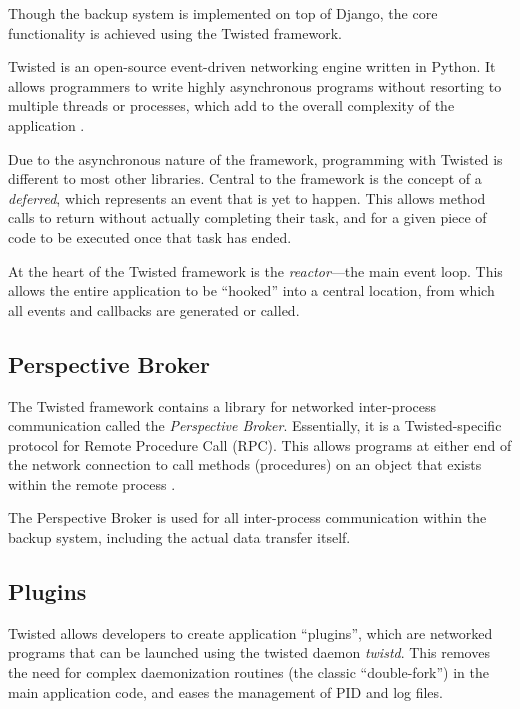 Though the backup system is implemented on top of Django, the core
functionality is achieved using the Twisted framework.

Twisted is an open-source event-driven networking engine written in Python. It
allows programmers to write highly asynchronous programs without resorting to
multiple threads or processes, which add to the overall complexity of the
application \cite{kinder2005}.

Due to the asynchronous nature of the framework, programming with Twisted is
different to most other libraries. Central to the framework is the concept of
a \emph{deferred}, which represents an event that is yet to happen. This allows
method calls to return without actually completing their task, and for a given
piece of code to be executed once that task has ended.

At the heart of the Twisted framework is the \emph{reactor}---the main event
loop. This allows the entire application to be ``hooked'' into a central
location, from which all events and callbacks are generated or called.

\subsection{Perspective Broker}
\label{sec:implementation-twisted-pb}

The Twisted framework contains a library for networked inter-process
communication called the \emph{Perspective Broker}. Essentially, it is
a Twisted-specific protocol for Remote Procedure Call (RPC). This allows
programs at either end of the network connection to call methods (procedures)
on an object that exists within the remote process \cite{lefkowitz2003}.

The Perspective Broker is used for all inter-process communication within the
backup system, including the actual data transfer itself.

\subsection{Plugins}
\label{sec:implementation-twisted-plugins}

Twisted allows developers to create application ``plugins'', which are
networked programs that can be launched using the twisted daemon \emph{twistd}.
This removes the need for complex daemonization routines (the classic
``double-fork'') in the main application code, and eases the management of PID
and log files.

